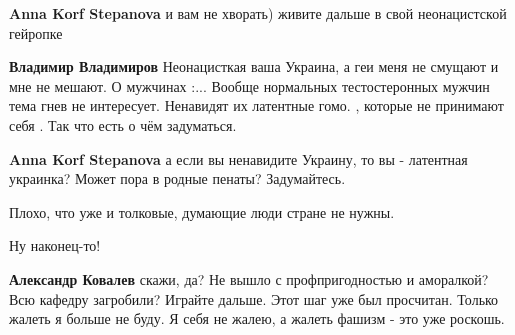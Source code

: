 \begin{itemize}
\begin{itemize}
\textbf{Anna Korf Stepanova} и вам не хворать) живите дальше в свой неонацистской гейропке

 
\textbf{Владимир Владимиров}
Неонацисткая ваша Украина, а геи меня не смущают и мне не мешают.
О мужчинах :...
Вообще нормальных тестостеронных мужчин тема гнев не интересует.
Ненавидят их латентные гомо. , которые не принимают себя .
Так что есть о чём задуматься.

 
\textbf{Anna Korf Stepanova} а если вы ненавидите Украину, то вы - латентная украинка? Может пора в родные пенаты? Задумайтесь.

\end{itemize}

 
Плохо, что уже и толковые, думающие люди стране не нужны.

 
Ну наконец-то! 

\begin{itemize}
 
\textbf{Александр Ковалев} скажи, да? Не вышло с профпригодностью и аморалкой? Всю кафедру загробили? Играйте дальше. Этот шаг уже был просчитан. Только жалеть я больше не буду. Я себя не жалею, а жалеть фашизм - это уже роскошь.

 

\end{itemize}
\end{itemize}
